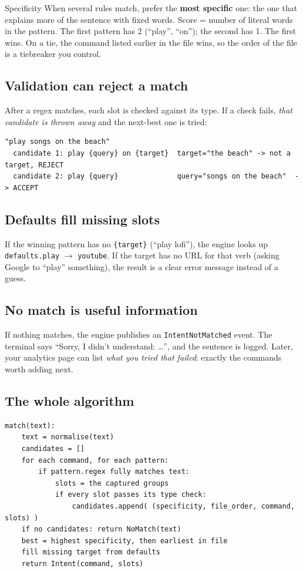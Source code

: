 \documentclass[11pt,a4paper]{article}
\begin{document}
\begin{concept}{Specificity}
When several rules match, prefer the \textbf{most specific} one: the one that explains more of
the sentence with fixed words. Score = number of literal words in the pattern. The first
pattern has 2 (``play'', ``on''); the second has 1. The first wins. On a tie, the command
listed earlier in the file wins, so the order of the file is a tiebreaker you control.
\end{concept}

\subsection{Validation can reject a match}
After a regex matches, each slot is checked against its type. If a check fails, \emph{that
candidate is thrown away} and the next-best one is tried:

\begin{lstlisting}
"play songs on the beach"
  candidate 1: play {query} on {target}  target="the beach" -> not a target, REJECT
  candidate 2: play {query}              query="songs on the beach"  -> ACCEPT
\end{lstlisting}

\subsection{Defaults fill missing slots}
If the winning pattern has no \texttt{\{target\}} (``play lofi''), the engine looks up
\texttt{defaults.play} $\to$ \texttt{youtube}. If the target has no URL for that verb (asking
Google to ``play'' something), the result is a clear error message instead of a guess.

\subsection{No match is useful information}
If nothing matches, the engine publishes an \texttt{IntentNotMatched} event. The terminal says
``Sorry, I didn't understand: \ldots'', and the sentence is logged. Later, your analytics page
can list \emph{what you tried that failed}: exactly the commands worth adding next.

\subsection{The whole algorithm}
\begin{lstlisting}
match(text):
    text = normalise(text)
    candidates = []
    for each command, for each pattern:
        if pattern.regex fully matches text:
            slots = the captured groups
            if every slot passes its type check:
                candidates.append( (specificity, file_order, command, slots) )
    if no candidates: return NoMatch(text)
    best = highest specificity, then earliest in file
    fill missing target from defaults
    return Intent(command, slots)
\end{lstlisting}
\end{document}
